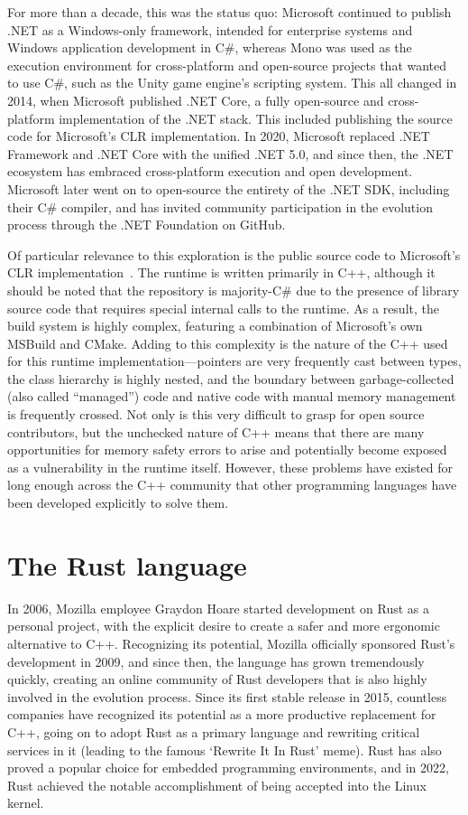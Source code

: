For more than a decade, this was the status quo: Microsoft continued to publish .NET as a Windows-only framework, intended for enterprise systems and Windows
application development in C\#, whereas Mono was used as the execution environment for cross-platform and open-source projects that wanted to use C\#,
such as the Unity game engine's scripting system. %
This all changed in 2014, when Microsoft published .NET Core, a fully open-source and cross-platform implementation of the .NET stack.
This included publishing the source code for Microsoft's CLR implementation.
In 2020, Microsoft replaced .NET Framework and .NET Core with the unified .NET 5.0, and since then, the .NET ecosystem has embraced
cross-platform execution and open development.
Microsoft later went on to open-source the entirety of the .NET SDK, including their C\# compiler,
and has invited community participation in the evolution process through the .NET Foundation on GitHub.

Of particular relevance to this exploration is the public source code to Microsoft's CLR implementation~\cite{runtime}.
The runtime is written primarily in C++, although it should be noted that the repository is majority-C\# due to the presence of
library source code that requires special internal calls to the runtime.
As a result, the build system is highly complex, featuring a combination of Microsoft's own MSBuild and CMake.
Adding to this complexity is the nature of the C++ used for this runtime implementation---pointers are very frequently cast between types,
the class hierarchy is highly nested, and the boundary between garbage-collected (also called ``managed'') code and native code with
manual memory management is frequently crossed.
Not only is this very difficult to grasp for open source contributors, but the unchecked nature of C++ means that there are many
opportunities for memory safety errors to arise and potentially become exposed as a vulnerability in the runtime itself.
However, these problems have existed for long enough across the C++ community that other programming languages have been developed
explicitly to solve them.

\section{The Rust language}
In 2006, Mozilla employee Graydon Hoare started development on Rust as a personal project,
with the explicit desire to create a safer and more ergonomic alternative to C++.
Recognizing its potential, Mozilla officially sponsored Rust's development in 2009, and since then, the language has grown tremendously quickly,
creating an online community of Rust developers that is also highly involved in the evolution process.
Since its first stable release in 2015, countless companies have recognized its potential as a more productive replacement for C++,
going on to adopt Rust as a primary language and rewriting critical services in it (leading to the famous `Rewrite It In Rust' meme).
Rust has also proved a popular choice for embedded programming environments, and in 2022,
Rust achieved the notable accomplishment of being accepted into the Linux kernel.

